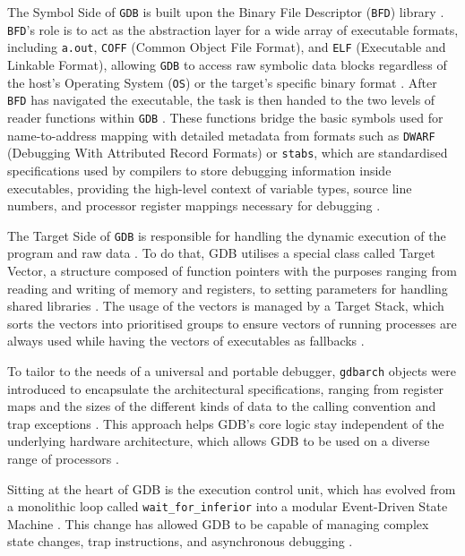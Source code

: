 The Symbol Side of \texttt{GDB} is built upon the Binary File Descriptor (\texttt{BFD}) library \cite{gdb_architecture}. \texttt{BFD}'s role is to act as the abstraction layer for a wide array of executable formats, including \texttt{a.out}, \texttt{COFF} (Common Object File Format), and \texttt{ELF} (Executable and Linkable Format), allowing \texttt{GDB} to access raw symbolic data blocks regardless of the host's Operating System (\texttt{OS}) or the target's specific binary format \cite{gdb_architecture}. After \texttt{BFD} has navigated the executable, the task is then handed to the two levels of reader functions within \texttt{GDB} \cite{gdb_architecture}. These functions bridge the basic symbols used for name-to-address mapping with detailed metadata from formats such as \texttt{DWARF} (Debugging With Attributed Record Formats) or \texttt{stabs}, which are standardised specifications used by compilers to store debugging information inside executables, providing the high-level context of variable types, source line numbers, and processor register mappings necessary for debugging \cite{gdb_architecture}.

The Target Side of \texttt{GDB} is responsible for handling the dynamic execution of the program and raw data \cite{gdb_architecture}. To do that, GDB utilises a special class called Target Vector, a structure composed of function pointers with the purposes ranging from reading and writing of memory and registers, to setting parameters for handling shared libraries \cite{gdb_architecture}. The usage of the vectors is managed by a Target Stack, which sorts the vectors into prioritised groups to ensure vectors of running processes are always used while having the vectors of executables as fallbacks \cite{gdb_architecture}.

To tailor to the needs of a universal and portable debugger, \texttt{gdbarch} objects were introduced to encapsulate the architectural specifications, ranging from register maps and the sizes of the different kinds of data to the calling convention and trap exceptions \cite{gdb_architecture}. This approach helps GDB's core logic stay independent of the underlying hardware architecture, which allows GDB to be used on a diverse range of processors \cite{gdb_architecture}.

Sitting at the heart of GDB is the execution control unit, which has evolved from a monolithic loop called \texttt{wait\_for\_inferior} into a modular Event-Driven State Machine \cite{gdb_architecture}. This change has allowed GDB to be capable of managing complex state changes, trap instructions, and asynchronous debugging \cite{gdb_architecture}. 

